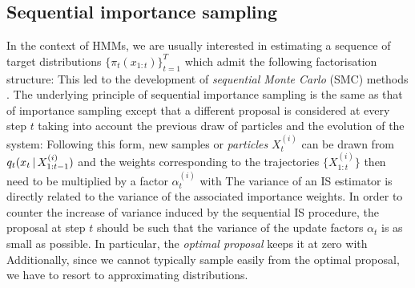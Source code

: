 \subsection{Sequential importance sampling}
In the context of HMMs, we are usually interested in estimating a sequence of target distributions $\{\pi_{t}(x_{1:t})\}_{t=1}^{T}$ which admit the following factorisation structure:
%
%
This led to the development of \emph{sequential Monte Carlo} (SMC) methods \citep[chapter 14.3]{robert04}. The underlying principle of sequential importance sampling is the same as that of importance sampling except that a different proposal is considered at every step $t$ taking into account the previous draw of particles and the evolution of the system:
%
%
Following this form, new samples or \emph{particles} $X^{(i)}_t$ can be drawn from $q_{t}(x_{t}\,|\, X^{(i)}_{1:t-1})$ and the weights corresponding to the trajectories $\{X^{(i)}_{1:t}\}$ then need to be multiplied by a factor $\alpha^{(i)}_{t}$ with
%
%
The variance of an IS estimator is directly related to the variance of the associated importance weights. In order to counter the increase of variance induced by the sequential IS procedure, the proposal at step $t$ should be such that the variance of the update factors $\alpha_t$ is as small as possible. In particular, the \emph{optimal proposal} \citep{doucet11} keeps it at zero with
Additionally, since we cannot typically sample easily from the optimal proposal, we have to resort to approximating distributions.

